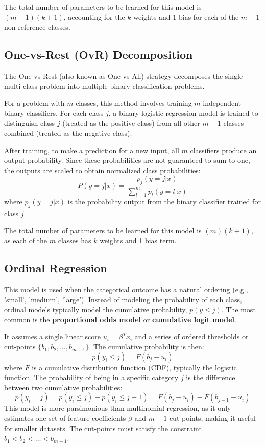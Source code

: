 \documentclass{article}
\begin{document}
\begin{multicols}{2}
	The total number of parameters to be learned for this model is $(m-1)(k+1)$, accounting for the $k$ weights and 1 bias for each of the $m-1$ non-reference classes.

	\subsection{One-vs-Rest (OvR) Decomposition}
	The One-vs-Rest (also known as One-vs-All) strategy decomposes the single multi-class problem into multiple binary classification problems.

	For a problem with $m$ classes, this method involves training $m$ independent binary classifiers. For each class $j$, a binary logistic regression model is trained to distinguish class $j$ (treated as the positive class) from all other $m-1$ classes combined (treated as the negative class).

	After training, to make a prediction for a new input, all $m$ classifiers produce an output probability. Since these probabilities are not guaranteed to sum to one, the outputs are scaled to obtain normalized class probabilities:
	$$ P(y=j|x) = \frac{p_j(y=j|x)}{\sum_{l=1}^{m} p_l(y=l|x)} $$
	where $p_j(y=j|x)$ is the probability output from the binary classifier trained for class $j$.

	The total number of parameters to be learned for this model is $(m)(k+1)$, as each of the $m$ classes has $k$ weights and 1 bias term.


	\subsection{Ordinal Regression}
	This model is used when the categorical outcome has a natural ordering (e.g., 'small', 'medium', 'large'). Instead of modeling the probability of each class, ordinal models typically model the cumulative probability, $p(y \le j)$. The most common is the \textbf{proportional odds model} or \textbf{cumulative logit model}.

	It assumes a single linear score $u_i = \beta^T x_i$ and a series of ordered thresholds or cut-points $\{b_1, b_2, \dots, b_{m-1}\}$. The cumulative probability is then:
	$$ p(y_i \le j) = F(b_j - u_i) $$
	where $F$ is a cumulative distribution function (CDF), typically the logistic function. The probability of being in a specific category $j$ is the difference between two cumulative probabilities:
	$$ p(y_i = j) = p(y_i \le j) - p(y_i \le j-1) = F(b_j - u_i) - F(b_{j-1} - u_i) $$
	This model is more parsimonious than multinomial regression, as it only estimates one set of feature coefficients $\beta$ and $m-1$ cut-points, making it useful for smaller datasets. The cut-points must satisfy the constraint $b_1 < b_2 < \dots < b_{m-1}$.


\end{multicols}
\end{document}
